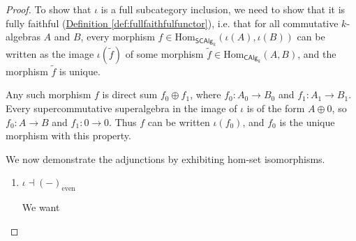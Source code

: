 \documentclass[a4paper,10pt]{scrreprt}
\newcommand{\Hom}{\mathrm{Hom}}
\theoremstyle{definition}
\theoremstyle{plain}
\theoremstyle{remark}
\begin{document}
\begin{proof}
  To show that $\iota$ is a full subcategory inclusion, we need to show that it is fully faithful (\hyperref[def:fullfaithfulfunctor]{Definition \ref*{def:fullfaithfulfunctor}}), i.e. that for all commutative $k$-algebras $A$ and $B$, every morphism $f\in \Hom_{\mathsf{SCAlg}_{k}}(\iota(A), \iota(B))$ can be written as the image $\iota(\tilde{f})$ of some morphism $\tilde{f} \in \Hom_{\mathsf{CAlg}_{k}}(A, B)$, and the morphism $\tilde{f}$ is unique.

  Any such morphism $f$ is direct sum $f_{0} \oplus f_{1}$, where $f_{0}\colon A_{0} \to B_{0}$ and $f_{1}\colon A_{1} \to B_{1}$. Every supercommutative superalgebra in the image of $\iota$ is of the form $A \oplus 0$, so $f_{0}\colon A \to B$ and $f_{1}\colon 0 \to 0$. Thus $f$ can be written $\iota(f_{0})$, and $f_{0}$ is the unique morphism with this property.

  We now demonstrate the adjunctions by exhibiting hom-set isomorphisms.
  \begin{enumerate}
    \item $\iota \dashv (-)_{\text{even}}$ 

      We want 
  \end{enumerate}
\end{proof}
\end{document}

